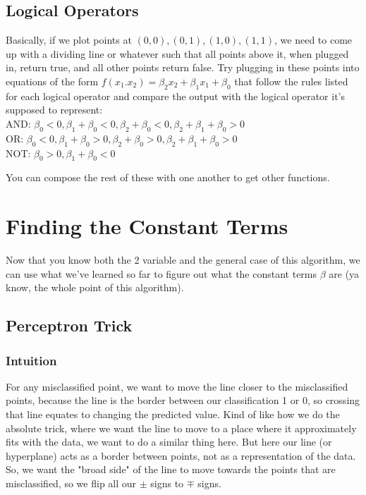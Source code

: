 \documentclass{article}
\begin{document}
\subsection{Logical Operators}
Basically, if we plot points at $(0, 0), (0, 1), (1, 0), (1, 1)$, we need to come up with a dividing line or whatever such that all points above it, when plugged in, return true, and all other points return false. Try plugging in these points into equations of the form $f(x_1.x_2) = \beta_2 x_2 + \beta_1 x_1 + \beta_0$ that follow the rules listed for each logical operator and compare the output with the logical operator it's supposed to represent:\\
AND: $\beta_0 < 0, \beta_1 + \beta_0 < 0, \beta_2 + \beta_0 < 0, \beta_2 + \beta_1 + \beta_0 > 0$ \\
OR: $\beta_0 < 0, \beta_1 + \beta_0 > 0, \beta_2 + \beta_0 > 0, \beta_2 + \beta_1 + \beta_0 > 0$ \\
NOT: $\beta_0 > 0, \beta_1 + \beta_0 < 0$

You can compose the rest of these with one another to get other functions.

\section{Finding the Constant Terms}
Now that you know both the 2 variable and the general case of this algorithm, we can use what we've learned so far to figure out what the constant terms $\beta$ are (ya know, the whole point of this algorithm).
\subsection{Perceptron Trick}
\subsubsection{Intuition}
For any misclassified point, we want to move the line closer to the misclassified points, because the line is the border between our classification 1 or 0, so crossing that line equates to changing the predicted value. Kind of like how we do the absolute trick, where we want the line to move to a place where it approximately fits with the data, we want to do a similar thing here. But here our line (or hyperplane) acts as a border between points, not as a representation of the data. So, we want the "broad side" of the line to move towards the points that are misclassified, so we flip all our $\pm$ signs to $\mp$ signs. 
\end{document}
